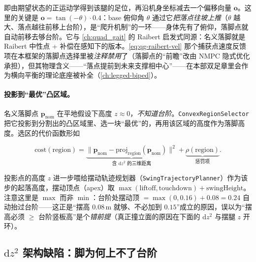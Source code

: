 即由期望状态的正运动学得到该腿的足位，再沿机身坐标减去一个偏移向量 $\mathbf{o}$。这里的关键是 $\mathbf{o}=\tan(-\theta)\cdot 0.4$：base 俯仰角 $\theta$ 通过它\emph{把落点往坡上推}（$\theta$ 越大、落点越往前移上台阶），是“爬升机制”的一环——身体先有了俯仰，落脚点就自动前移去够台阶。它与 \cref{ch:quad_gait} 的 Raibert 启发式同源：名义落脚就是 Raibert 中性点 + 补偿在感知下的版本。\cref{eq:qg-raibert-vel} 那个捕获点速度反馈项在本框架的落脚点选择里被\emph{注释禁用}了（落脚点的“前瞻”改由 NMPC 隐式优化承担），但其物理含义——“落点提前到未来支撑相中心”——在本部双足章里会作为横向平衡的理论底座被补全（\cref{ch:legged-biped}）。

\paragraph{投影到“最优”凸区域。}
名义落脚点 $\mathbf{p}_{\mathrm{nom}}$ 在平地假设下高度 $z\approx 0$，\emph{不知道台阶}。\texttt{ConvexRegionSelector} 把它投影到分割出的凸区域里、选一块“最优”的，再用该区域的高度作为落脚高度。选区的代价函数形如

\begin{equation}
  \text{cost}(\text{region}) = \underbrace{\big\| \mathbf{p}_{\mathrm{nom}} - \mathrm{proj}_{\text{region}}(\mathbf{p}_{\mathrm{nom}})\big\|^2}_{\text{含 } \mathrm{d}z^2 \text{ 的三维距离}} + \underbrace{\rho(\text{region})}_{\text{惩罚项}}.
  \label{eq:lp-region-cost}
\end{equation}

投影点的高度 $z$ 进一步喂给摆动轨迹规划器（\texttt{SwingTrajectoryPlanner}）作为该步的起落高度，摆动顶点（apex）取 $\max(\text{liftoff},\text{touchdown})+\text{swingHeight}$。注意这里是 $\max$ 而非 $\min$：台阶处摆动顶 $=\max(0,0.16)+0.08=0.24$ 自动抬过台阶——这正是“摆高 $0.08\,$m 就够、不必加到 $0.15$”成立的原因，误以为“摆高必须 $\ge$ 台阶竖板高”是个\emph{错前提}（真正撞立面的原因在下面的 $\mathrm{d}z^2$ 与摆腿 $z$ 开环）。

\subsection{\texorpdfstring{$\mathrm{d}z^2$}{dz2} 架构缺陷：脚为何上不了台阶}
\label{subsec:lp-dz2}

